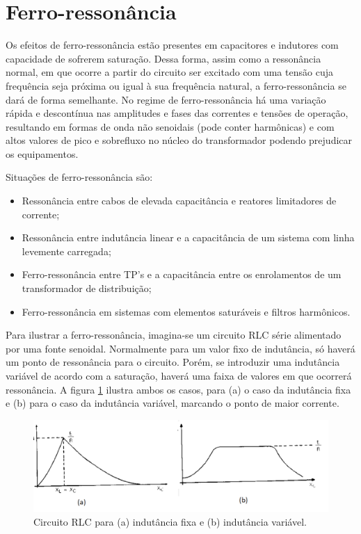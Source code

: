 \section{Ferro-ressonância}

Os efeitos de ferro-ressonância estão presentes em capacitores e indutores com capacidade de sofrerem saturação. Dessa forma, assim como a ressonância normal, em que ocorre a partir do circuito ser excitado com uma tensão cuja frequência seja próxima ou igual à sua frequência natural, a ferro-ressonância se dará de forma semelhante. No regime de ferro-ressonância há uma variação rápida e descontínua nas amplitudes e fases das correntes e tensões de operação, resultando em formas de onda não senoidais (pode conter harmônicas) e com altos valores de pico e sobrefluxo no núcleo do transformador podendo prejudicar os equipamentos.

Situações de ferro-ressonância são:

\begin{itemize}
    \item Ressonância entre cabos de elevada capacitância e reatores limitadores de corrente;
    \item Ressonância entre indutância linear e a capacitância de um sistema com linha levemente carregada;
    \item Ferro-ressonância entre TP's e a capacitância entre os enrolamentos de um transformador de distribuição;
    \item Ferro-ressonância em sistemas com elementos saturáveis e filtros harmônicos.
\end{itemize}

Para ilustrar a ferro-ressonância, imagina-se um circuito RLC série alimentado por uma fonte senoidal. Normalmente para um valor fixo de indutância, só haverá um ponto de ressonância para o circuito. Porém, se introduzir uma indutância variável de acordo com a saturação, haverá uma faixa de valores em que ocorrerá ressonância. A figura \ref{slide5:rlc} ilustra ambos os casos, para (a) o caso da indutância fixa e (b) para o caso da indutância variável, marcando o ponto de maior corrente.

\begin{figure}[H]
\begin{center}
\includegraphics[width=12cm]{images/RLC.png}
\caption{Circuito RLC para (a) indutância fixa e (b) indutância variável.}
\label{slide5:rlc} 
\end{center}
\end{figure}

